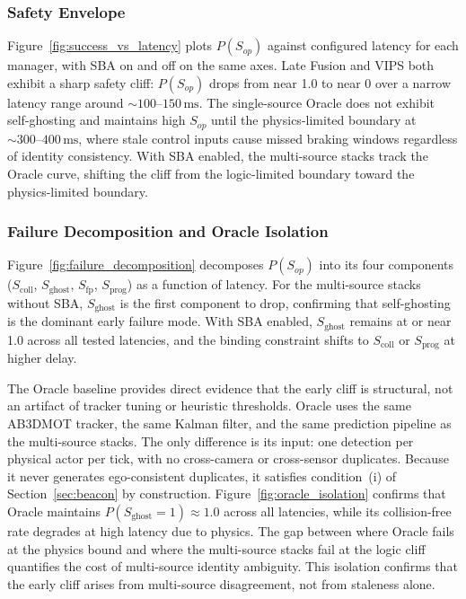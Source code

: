 


\subsubsection{Safety Envelope}
\label{sec:eval:envelope}

Figure~\ref{fig:success_vs_latency} plots $P(S_{op})$ against configured latency for each manager, with SBA on and off on the same axes. Late Fusion and VIPS both exhibit a sharp safety cliff: $P(S_{op})$ drops from near 1.0 to near 0 over a narrow latency range around ${\sim}100\text{--}150\,\mathrm{ms}$. The single-source Oracle does not exhibit self-ghosting and maintains high $S_{op}$ until the physics-limited boundary at ${\sim}300\text{--}400\,\mathrm{ms}$, where stale control inputs cause missed braking windows regardless of identity consistency. With SBA enabled, the multi-source stacks track the Oracle curve, shifting the cliff from the logic-limited boundary toward the physics-limited boundary.




\subsubsection{Failure Decomposition and Oracle Isolation}
\label{sec:eval:decomposition}

Figure~\ref{fig:failure_decomposition} decomposes $P(S_{op})$ into its four components ($S_{\text{coll}}$, $S_{\text{ghost}}$, $S_{\text{fp}}$, $S_{\text{prog}}$) as a function of latency. For the multi-source stacks without SBA, $S_{\text{ghost}}$ is the first component to drop, confirming that self-ghosting is the dominant early failure mode. With SBA enabled, $S_{\text{ghost}}$ remains at or near 1.0 across all tested latencies, and the binding constraint shifts to $S_{\text{coll}}$ or $S_{\text{prog}}$ at higher delay.

The Oracle baseline provides direct evidence that the early cliff is structural, not an artifact of tracker tuning or heuristic thresholds. Oracle uses the same AB3DMOT tracker, the same Kalman filter, and the same prediction pipeline as the multi-source stacks. The only difference is its input: one detection per physical actor per tick, with no cross-camera or cross-sensor duplicates. Because it never generates ego-consistent duplicates, it satisfies condition~(i) of Section~\ref{sec:beacon} by construction. Figure~\ref{fig:oracle_isolation} confirms that Oracle maintains $P(S_{\text{ghost}} = 1) \approx 1.0$ across all latencies, while its collision-free rate degrades at high latency due to physics. The gap between where Oracle fails at the physics bound and where the multi-source stacks fail at the logic cliff quantifies the cost of multi-source identity ambiguity. This isolation confirms that the early cliff arises from multi-source disagreement, not from staleness alone.

